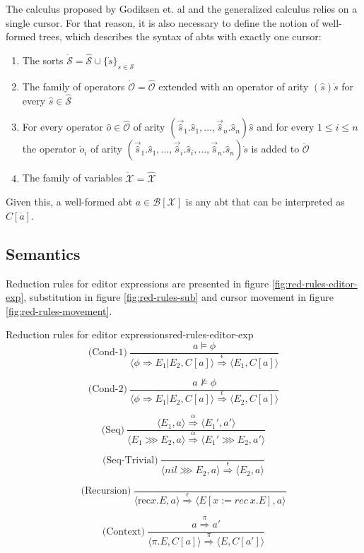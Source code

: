 The calculus proposed by Godiksen et. al and the generalized calculus relies on a single cursor. For that reason, it is also necessary to define the notion of well-formed trees, which describes the syntax of abts with exactly one cursor:

\begin{enumerate}
    \item The sorts $\dot{\mathcal{S}} = \hat{\mathcal{S}} \cup \{ \dot{s} \}_{s \in \mathcal{S}}$
    \item The family of operators $\dot{\mathcal{O}} = \hat{\mathcal{O}}$ extended with an operator of arity $(\hat{s})\dot{s}$ for every $\hat{s} \in \hat{\mathcal{S}}$
    \item For every operator $\hat{o} \in \hat{\mathcal{O}}$ of arity $(\vec{\hat{s}}_1.\hat{s}_1,...,\vec{\hat{s}}_n.\hat{s}_n)\hat{s}$ and for every $1 \leq i \leq n$ the operator $\dot{o}_i$ of arity $(\vec{\hat{s}}_1.\hat{s}_1,...,\vec{\hat{s}}_i.\hat{s}_i,...,\vec{\hat{s}}_n.\hat{s}_n)\dot{s}$ is added to $\dot{\mathcal{O}}$
    \item The family of variables $\dot{\mathcal{X}} = \hat{\mathcal{X}}$
\end{enumerate}

Given this, a well-formed abt $a \in \mathcal{B[\mathcal{X}]}$ is any abt that can be interpreted as $C[\dot{a}]$.

\subsection{Semantics}
Reduction rules for editor expressions are presented in figure \ref{fig:red-rules-editor-exp}, substitution in figure \ref{fig:red-rules-sub} and cursor movement in figure \ref{fig:red-rules-movement}.



\begin{myfigure}{Reduction rules for editor expressions}{red-rules-editor-exp}
    \[
        \text{(Cond-1)} \ \frac{a \models \phi}{\langle \phi \Rightarrow E_1|E_2, C[a] \rangle \stackrel{\epsilon}{\Rightarrow} \langle E_1, C[a] \rangle}
    \]

    \[
        \text{(Cond-2)} \ \frac{a \not\models \phi}{\langle \phi \Rightarrow E_1|E_2, C[a] \rangle \stackrel{\epsilon}{\Rightarrow} \langle E_2, C[a] \rangle}
    \]

    \[
        \text{(Seq)} \ \frac{\langle E_1,a \rangle \stackrel{\alpha}{\Rightarrow} \langle E_1',a' \rangle}{\langle E_1 \ggg E_2,a \rangle \stackrel{\alpha}{\Rightarrow} \langle E_1' \ggg E_2,a' \rangle}
    \]

    \[
        \text{(Seq-Trivial)} \ \frac{}{\langle nil \ggg E_2,a \rangle \stackrel{\epsilon}{\Rightarrow} \langle E_2, a \rangle}
    \]

    \[
        \text{(Recursion)} \ \frac{}{\langle \text{rec} x.E,a \rangle \stackrel{\epsilon}{\Rightarrow} \langle E[x:= rec \ x.E],a \rangle}
    \]

    \[
        \text{(Context)} \ \frac{a \stackrel{\pi}{\Rightarrow} a'}{\langle \pi.E,C[a] \rangle \stackrel{\pi}{\Rightarrow} \langle E,C[a'] \rangle}
    \]
\end{myfigure}

